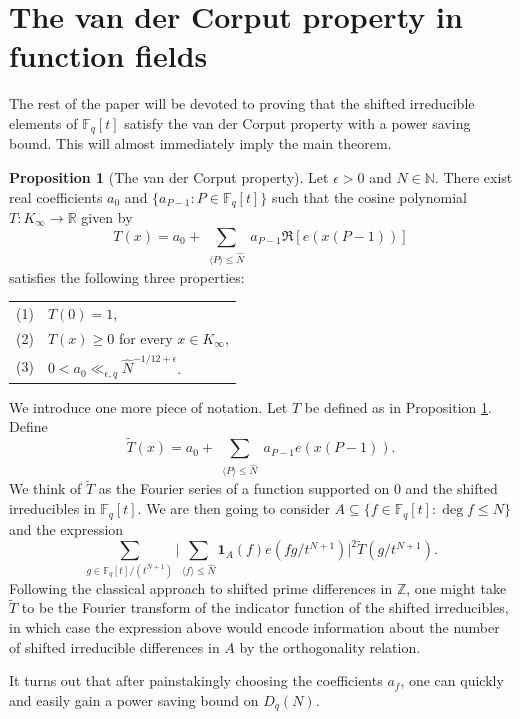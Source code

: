 \documentclass{article}
\theoremstyle{definition}
\newtheorem{prop}{Proposition}[section]
\theoremstyle{definition}
\theoremstyle{remark}
\newcommand{\R}{\mathbb{R}}
\newcommand{\Z}{\mathbb{Z}}
\newcommand{\N}{\mathbb{N}}
\newcommand{\F}{\mathbb{F}_q[t]}
\newcommand{\1}{\mathbf{1}}
\numberwithin{equation}{section}
\begin{document}
\section{The van der Corput property in function fields}
The rest of the paper will be devoted to proving that the shifted irreducible elements of $\F$ satisfy the van der Corput property with a power saving bound. This will almost immediately imply the main theorem.  
\begin{prop}[The van der Corput property]\label{vdc}
Let $\epsilon>0$ and $N\in \N$. There exist real coefficients $a_0$ and $\{a_{P-1}: P\in \F\}$ such that the cosine polynomial $T: K_\infty \to \R$ given by 
\[T(x)=a_0+\sum_{
\substack{\langle P\rangle \leq \widehat{N}}}a_{P-1}\Re\left[e\left(x(P-1)\right)\right] \]
satisfies the following three properties:

\begin{center}
\begin{tabular}{rl}
(1) & $T(0) = 1$, \\
(2) & $T(x) \geq 0$ for every $x \in K_\infty$, \\
(3) & $0<a_0 \ll_{\epsilon,q} \widehat{N}^{-1/12+\epsilon}$. \\
\end{tabular}
\end{center}

\end{prop}

We introduce one more piece of notation. Let $T$ be defined as in Proposition \ref{vdc}. Define 
\[\widetilde{T}(x)=a_0+\sum_{
\substack{\langle P\rangle \leq \widehat{N}}}a_{P-1}e\left(x(P-1)\right). \]
We think of $\widetilde{T}$ as the Fourier series of a function supported on $0$ and the shifted irreducibles in $\F$. We are then going to consider $A\subseteq\{f\in \F: \deg f \leq N\}$ and the expression 
\[\sum_{g\in \F/ (t^{N+1})}\Bigg|\sum_{\langle f \rangle \leq \widehat{N}}\1_A(f)e\left(fg/ t^{N+1}\right)\Bigg|^2\widetilde{T}(g/ t^{N+1}).\]
Following the classical approach to shifted prime differences in $\Z$, one might take $\widetilde{T}$ to be the Fourier transform of the indicator function of the shifted irreducibles, in which case the expression above would encode information about the number of shifted irreducible differences in $A$ by the orthogonality relation.  

It turns out that after painstakingly choosing the coefficients $a_f$, one can quickly and easily gain a power saving bound on $D_q(N)$. 
\end{document}
